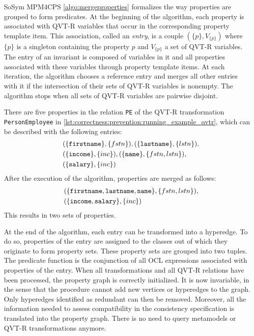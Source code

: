 \begin{copiedFrom}{SoSym MPM4CPS}
\autoref{algo:mergeproperties} formalizes the way properties are grouped to form predicates. At the beginning of the algorithm, each property is associated with QVT-R variables that occur in the corresponding property template item. This association, called an \textit{entry}, is a couple $(\{p\}, V_{\{p\}})$ where $\{p\}$ is a singleton containing the property $p$ and $V_{\{p\}}$ a set of QVT-R variables. The entry of an invariant is composed of variables in it and all properties associated with these variables through property template items. At each iteration, the algorithm chooses a reference entry and merges all other entries with it if the intersection of their sets of QVT-R variables is nonempty. The algorithm stops when all sets of QVT-R variables are pairwise disjoint.

\begin{example}
There are five properties in the relation \texttt{PE} of the QVT-R transformation \texttt{PersonEmployee} in \autoref{lst:correctness:prevention:running_example_qvtr}, which can be described with the following entries:
\begin{align*}
\hspace{1em}
&(\{\texttt{firstname}\}, \{fstn\}), (\{\texttt{lastname}\}, \{lstn\}),\\ &(\{\texttt{income}\}, \{inc\}), (\{\texttt{name}\}, \{fstn, lstn\}),\\ &(\{\texttt{salary}\}, \{inc\})
\end{align*}
After the execution of the algorithm, properties are merged as follows:
\begin{align*}
\hspace{1em}
&(\{\texttt{firstname}, \texttt{lastname}, \texttt{name}\}, \{fstn, lstn\}),\\
&(\{\texttt{income}, \texttt{salary}\}, \{inc\})
\end{align*}
This results in two sets of properties.
\end{example}

At the end of the algorithm, each entry can be transformed into a hyperedge. To do so, properties of the entry are assigned to the classes out of which they originate to form property sets. These property sets are grouped into two tuples. The predicate function is the conjunction of all OCL expressions associated with properties of the entry.
When all transformations and all QVT-R relations have been processed, the property graph is correctly initialized. It is now invariable, in the sense that the procedure cannot add new vertices or hyperedges to the graph. Only hyperedges identified as redundant can then be removed. Moreover, all the information needed to assess compatibility in the consistency specification is translated into the property graph. There is no need to query metamodels or QVT-R transformations anymore.


\end{copiedFrom}
